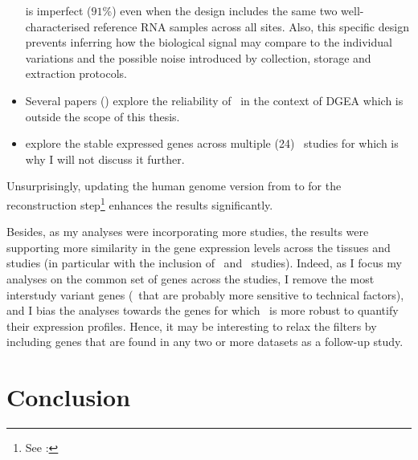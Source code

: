 \begin{itemize}[topsep=0pt,nosep]
is imperfect ($91$\%)
even when the design includes
the same two well-characterised reference RNA samples across all sites.
Also,
this specific design prevents inferring how the biological signal
may compare to the individual variations and the possible noise introduced
by collection, storage and extraction protocols.
\item Several papers (\cite{Khang2015-qt,ruvseqComQN,Rau2014-va})
    explore the reliability of \Rnaseq\ in the context of
    \gls{DGEA} which is outside the scope of this thesis.
\item\cite{Zhuo2016-qi} explore the stable expressed genes across multiple
    (24) \Rnaseq\ studies for 
    which is why I will not discuss it further.
\end{itemize}

Unsurprisingly,
updating the human genome version from  to 
for the reconstruction
step\footnote{See : }
enhances the results significantly.

Besides, as my analyses were incorporating more studies,
the results were supporting more similarity in the gene expression levels across
the tissues and studies
(in particular with the inclusion of \uhlen\ and \gtex\ studies).
Indeed, as I focus my analyses on the common set of genes across the studies,
I remove the most interstudy variant genes
(\ie\ that are probably more sensitive to technical factors), and
I bias the analyses towards the genes
for which \Rnaseq\ is more robust to quantify their expression profiles.
Hence, it may be interesting to relax the filters by including genes
that are found in any two or more datasets as a follow-up study.


\section{Conclusion}


